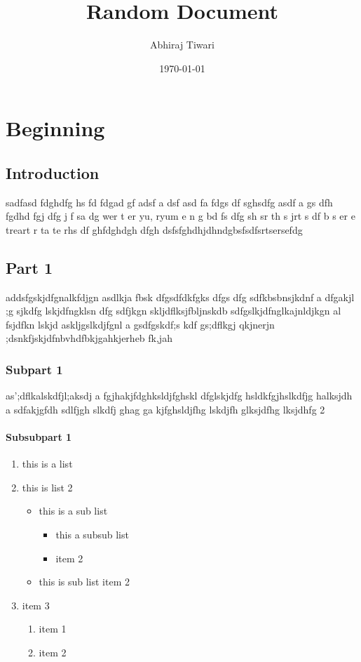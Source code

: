 \documentclass[a4paper, 12pt]{report}
\begin{document}
	\title{Random Document}
	\author{Abhiraj Tiwari}
	\date{\today}
	\maketitle
	\newpage
	\tableofcontents
	\newpage
	\chapter{Beginning}
	\section{Introduction}
	sadfasd fdghdfg hs fd  fdgad gf adsf a dsf asd fa fdgs df sghsdfg
	asdf a gs dfh  fgdhd fgj  dfg j f sa dg wer t er yu, ryum e n g bd
	fs dfg sh sr th s jrt s  df b s er e treart r ta te rhs df ghfdghdgh dfgh
	dsfsfghdhjdhndgbsfsdfsrtsersefdg
	
	\section{Part 1}
	addsfgskjdfgnalkfdjgn asdlkja fbsk dfgsdfdkfgks dfgs dfg sdfkbsbnsjkdnf a dfgakjl ;g
	sjkdfg lskjdfngklsn dfg sdfjkgn skljdflksjfbljnskdb sdfgslkjdfnglkajnldjkgn al fsjdfkn lskjd 
	askljgslkdjfgnl  a gsdfgskdf;s kdf gs;dflkgj qkjnerjn ;dsnkfjskjdfnbvhdfbkjgahkjerheb fk,jah
	
	\subsection{Subpart 1}
	as';dflkalskdfjl;aksdj a fgjhakjfdghksldjfghskl dfglskjdfg hsldkfgjhslkdfjg halksjdh a
	sdfakjgfdh sdlfjgh slkdfj ghag
	ga kjfghsldjfhg lskdjfh glksjdfhg lksjdhfg
	2
	\subsubsection{Subsubpart 1}
	\begin{enumerate}
		\item this is a list
		\item this is list 2
			\begin{itemize}
				\item this is a sub list
					\begin{itemize}
						\item this a subsub list
						\item item 2
					\end{itemize}
				\item this is sub list item 2
			\end{itemize}
		\item item 3
			\begin{enumerate}
				\item item 1
				\item item 2
			\end{enumerate}
	\end{enumerate}
\end{document}
